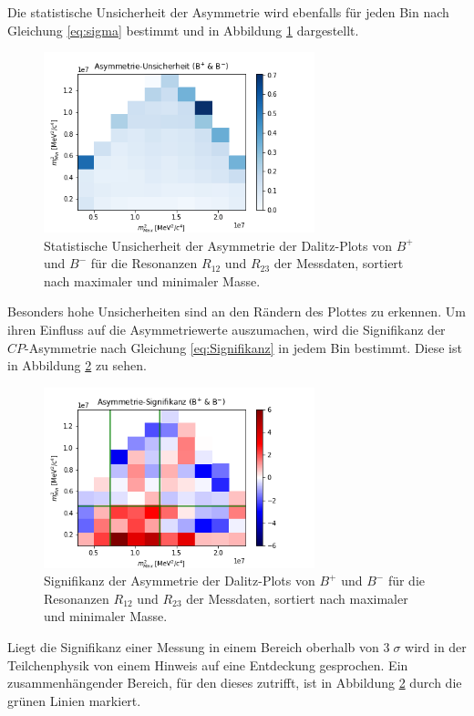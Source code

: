 \FloatBarrier
Die statistische Unsicherheit der Asymmetrie wird ebenfalls für jeden Bin nach Gleichung \eqref{eq:sigma} bestimmt und in Abbildung \ref{fig:DalitzAsymmUnsi} dargestellt.
\begin{figure}
  \centering
  \includegraphics[width=0.7\textwidth]{plots/Asymm_Fehler_Dalitz.png}
  \caption{Statistische Unsicherheit der Asymmetrie der Dalitz-Plots von $B^{+}$ und $B^{-}$ für die Resonanzen $R_{12}$ und $R_{23}$ der Messdaten, sortiert nach maximaler und minimaler Masse.}
  \label{fig:DalitzAsymmUnsi}
\end{figure} 
\FloatBarrier
Besonders hohe Unsicherheiten sind an den Rändern des Plottes zu erkennen. Um ihren Einfluss auf die Asymmetriewerte auszumachen, wird die Signifikanz der $CP$-Asymmetrie nach Gleichung \eqref{eq:Signifikanz} in jedem Bin bestimmt. Diese ist in Abbildung \ref{fig:DalitzSign} zu sehen.
\begin{figure}
  \centering
  \includegraphics[width=0.7\textwidth]{plots/Asymm_Sig_Dalitz.png}
  \caption{Signifikanz der Asymmetrie der Dalitz-Plots von $B^{+}$ und $B^{-}$ für die Resonanzen $R_{12}$ und $R_{23}$ der Messdaten, sortiert nach maximaler und minimaler Masse.}
  \label{fig:DalitzSign}
\end{figure} 
\FloatBarrier
Liegt die Signifikanz einer Messung in einem Bereich oberhalb von $3\;\sigma$ wird in der Teilchenphysik von einem Hinweis auf eine Entdeckung gesprochen. Ein zusammenhängender Bereich, für den dieses zutrifft, ist in Abbildung \ref{fig:DalitzSign} durch die grünen Linien markiert.

